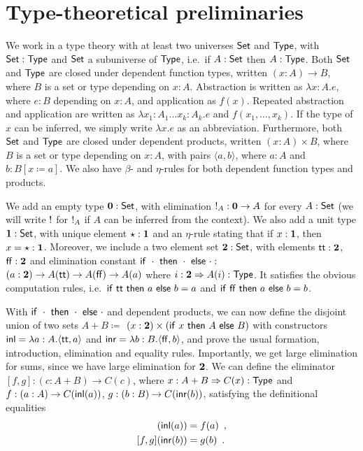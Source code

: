 \documentclass{article}
\begin{document}
\section{Type-theoretical preliminaries}
\label{sec:preliminaries}

We work in a type theory with at least two universes $\mathsf{Set}$ and
$\mathsf{Type}$, with $\mathsf{Set} : \mathsf{Type}$ and $\mathsf{Set}$ a subuniverse of $\mathsf{Type}$,
i.e.\ if $A : \mathsf{Set}$ then $A : \mathsf{Type}$. Both $\mathsf{Set}$ and $\mathsf{Type}$ are
closed under dependent function types, written $(x : A) \to B$, where
$B$ is a set or type depending on $x: A$. Abstraction is written as
$\lambda x : A . e$, where $e : B$ depending on $x : A$, and
application as $f(x)$. Repeated abstraction and application are
written as $\lambda x_1 : A_1 \ldots x_k : A_k . e$ and $f(x_1,
\ldots, x_k)$. If the type of $x$ can be inferred, we simply write
$\lambda x.e$ as an abbreviation.  Furthermore, both $\mathsf{Set}$ and
$\mathsf{Type}$ are closed under dependent products, written $(x : A) \times
B$, where $B$ is a set or type depending on $x: A$, with pairs
$\langle a , b \rangle$, where $a : A$ and $b : B[x \coloneqq a]$.
We also have $\beta$- and $\eta$-rules for both dependent function types
and products.

We add an empty type $\mathbf{0} : \mathsf{Set}$, with elimination ${!_{A} : \mathbf{0}
  \to A}$ for every $A : \mathsf{Set}$ (we will write $!$ for $!_{A}$ if $A$ can
be inferred from the context). We also add a unit type $\mathbf{1} : \mathsf{Set}$,
with unique element $\star : \mathbf{1}$ and an $\eta$-rule stating that
if $x : \mathbf{1}$, then $x = \star : \mathbf{1}$. Moreover, we include a two
element set $\mathbf{2} : \mathsf{Set}$, with elements $\mathsf{tt} : \mathbf{2}$, $\mathsf{ff} :
\mathbf{2}$ and elimination constant $\mathsf{if}~\cdot~\mathsf{then}~\cdot~\mathsf{else}~\cdot :$
$(a : \mathbf{2}) \to A(\mathsf{tt}) \to A(\mathsf{ff}) \to A(a)$ where $i : \mathbf{2}
\Rightarrow A(i) : \mathsf{Type}$. It satisfies the obvious computation rules,
i.e.\ $\mathsf{if}~\mathsf{tt}~\mathsf{then}~a~\mathsf{else}~b = a$ and $\mathsf{if}~\mathsf{ff}~\mathsf{then}~a~\mathsf{else}~b
= b$.

With $\mathsf{if}~\cdot~\mathsf{then}~\cdot~\mathsf{else}~\cdot$ and dependent products, we can now
define the disjoint union of two sets $A + B \coloneqq$ ${(x : \mathbf{2})}
\times (\mathsf{if}~x~\mathsf{then}~A~\mathsf{else}~B)$ with constructors $\mathsf{inl} = \lambda {a :
  A} . \langle \mathsf{tt} , a \rangle$ and $\mathsf{inr} = \lambda {b : B}
. \langle \mathsf{ff} , b \rangle$, and prove the usual formation,
introduction, elimination and equality rules. Importantly, we get
large elimination for sums, since we have large elimination for
$\mathbf{2}$. We can define the eliminator ${[f, g] : {(c : A + B)} \to C(c)}$, where
$x : A + B \Rightarrow C(x) : \mathsf{Type}$ and $f : (a : A) \to C(\mathsf{inl}(a))$,
$g : (b : B) \to C(\mathsf{inr}(b))$, satisfying the definitional equalities
\begin{align*}
[f, g](\inl(a)) &= f(a) \enspace , \\
[f, g](\inr(b)) &= g(b) \enspace .
\end{align*}
\end{document}
